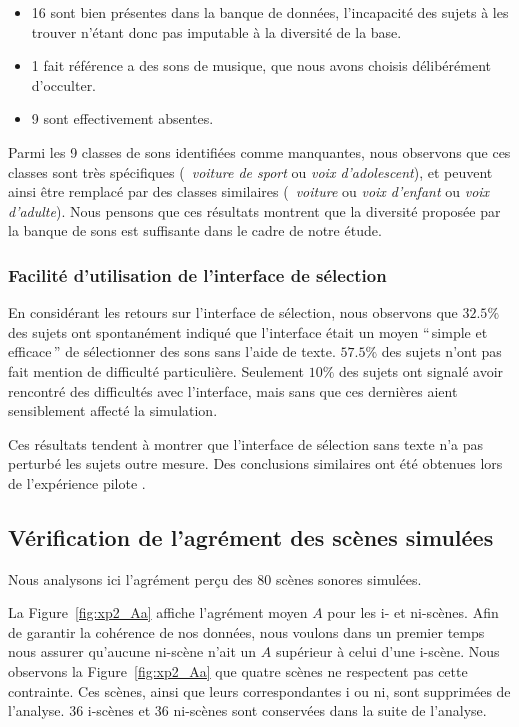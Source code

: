 \begin{itemize}
\item  16 sont bien présentes dans la banque de données, l'incapacité des sujets à les trouver n'étant donc pas imputable à la diversité de la base.
\item 1 fait référence a des sons de musique, que nous avons choisis délibérément d'occulter.
\item 9 sont effectivement absentes.  
\end{itemize}

Parmi les 9 classes de sons identifiées comme manquantes, nous observons que ces classes sont très spécifiques (\eg~\emph{voiture de sport} ou \emph{voix d'adolescent}), et peuvent ainsi être remplacé par des classes similaires (\eg~\emph{voiture} ou \emph{voix d'enfant} ou \emph{voix d'adulte}). Nous pensons que ces résultats montrent que la diversité proposée par la banque de sons est suffisante dans le cadre de notre étude.

\subsubsection{Facilité d'utilisation de l'interface de sélection}

En considérant les retours sur l'interface de sélection, nous observons que $32.5\%$ des sujets ont spontanément indiqué que l'interface était un moyen ``\,simple et efficace\,'' de sélectionner des sons sans l'aide de texte. $57.5\%$ des sujets n'ont pas fait mention de difficulté particulière. Seulement $10\%$ des sujets ont signalé avoir rencontré des difficultés avec l'interface, mais sans que ces dernières aient sensiblement affecté la simulation.

Ces résultats tendent à montrer que l'interface de sélection sans texte n'a pas perturbé les sujets outre mesure. Des conclusions similaires ont été obtenues lors de l'expérience pilote \citep{lafay2013atiam,lafay2014new}. \\


\subsection{Vérification de l'agrément des scènes simulées}

Nous analysons ici l'agrément perçu des $80$ scènes sonores simulées. 

La Figure~\ref{fig:xp2_Aa} affiche l'agrément moyen $A$ pour les i- et ni-scènes. Afin de garantir la cohérence de nos données, nous voulons dans un premier temps nous assurer qu'aucune ni-scène n'ait un $A$ supérieur à celui d'une i-scène. Nous observons la Figure~\ref{fig:xp2_Aa} que quatre scènes ne respectent pas cette contrainte. Ces scènes, ainsi que leurs correspondantes i ou ni, sont supprimées de l'analyse. 36 i-scènes et 36 ni-scènes sont conservées dans la suite de l'analyse.

